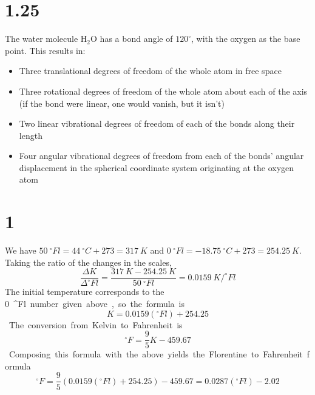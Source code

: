 \documentclass{article}
\begin{document}
\section*{1.25}
The water molecule $\textrm{H}_2\textrm{O}$ has a bond angle of $120^\circ$, with the oxygen as the base point. This results in:
\begin{itemize}
\item Three translational degrees of freedom of the whole atom in free space
\item Three rotational degrees of freedom of the whole atom about each of the axis (if the bond were linear, one would vanish, but it isn't)
\item Two linear vibrational degrees of freedom of each of the bonds along their length
\item Four angular vibrational degrees of freedom from each of the bonds' angular displacement in the spherical coordinate system originating at the oxygen atom
\end{itemize}

\section*{1}
We have $\SI{50}{^\circ Fl}=\SI{44}{^\circ C}+273=\SI{317}{K}$ and $\SI{0}{^\circ Fl}=\SI{-18.75}{^\circ C}+273=\SI{254.25}{K}$. Taking the ratio of the changes in the scales,
\[\frac{\Delta K}{\Delta ^\circ Fl}=\frac{\SI{317}{K}-\SI{254.25}{K}}{\SI{50}{^\circ Fl}}=\SI{0.0159}{K/^\circ Fl}\]
The initial temperature corresponds to the \SI{0}{^\circ Fl} number given above, so the formula is
\[K=0.0159(^\circ Fl)+254.25\]
The conversion from Kelvin to Fahrenheit is
\[^\circ F=\frac{9}{5}K-459.67\]
Composing this formula with the above yields the Florentine to Fahrenheit formula
\[^\circ F=\frac{9}{5}(0.0159(^\circ Fl)+254.25)-459.67=0.0287(^\circ Fl)-2.02\]
\end{document}

